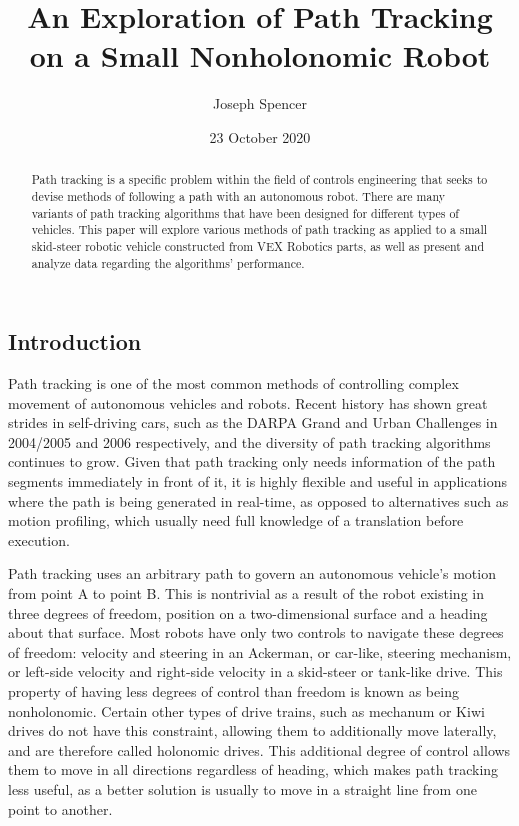 \documentclass[mla7]{mla}
\title{An Exploration of Path Tracking on a Small Nonholonomic Robot}
\author{Joseph Spencer}
\date{23 October 2020}
\begin{document}
\begin{abstract}

Path tracking is a specific problem within the field of controls engineering that seeks to devise methods of following a path with an autonomous robot. There are many variants of path tracking algorithms that have been designed for different types of vehicles. This paper will explore various methods of path tracking as applied to a small skid-steer robotic vehicle constructed from VEX Robotics parts, as well as present and analyze data regarding the algorithms' performance.

\end{abstract}

\begin{paper}

\section{Introduction}

Path tracking is one of the most common methods of controlling complex movement of autonomous vehicles and robots. Recent history has shown great strides in self-driving cars, such as the DARPA Grand and Urban Challenges in 2004/2005 and 2006 respectively, and the diversity of path tracking algorithms continues to grow. Given that path tracking only needs information of the path segments immediately in front of it, it is highly flexible and useful in applications where the path is being generated in real-time, as opposed to alternatives such as motion profiling, which usually need full knowledge of a translation before execution.

Path tracking uses an arbitrary path to govern an autonomous vehicle's motion from point A to point B. This is nontrivial as a result of the robot existing in three degrees of freedom, position on a two-dimensional surface and a heading about that surface. Most robots have only two controls to navigate these degrees of freedom: velocity and steering in an Ackerman, or car-like, steering mechanism, or left-side velocity and right-side velocity in a skid-steer or tank-like drive. This property of having less degrees of control than freedom is known as being nonholonomic. Certain other types of drive trains, such as mechanum or Kiwi drives do not have this constraint, allowing them to additionally move laterally, and are therefore called holonomic drives. This additional degree of control allows them to move in all directions regardless of heading, which makes path tracking less useful, as a better solution is usually to move in a straight line from one point to another.


\end{paper}
\end{document}
